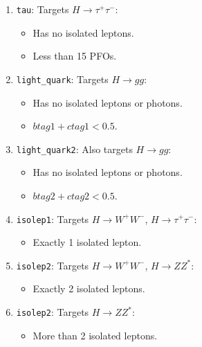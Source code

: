 \documentclass[11pt, hidelinks, a4paper]{scrartcl}
\newcommand{\tn}[1]{\textnormal{#1}}
\newcommand{\eV}{\text{e\kern-0.15ex V}\xspace}
\newcommand{\GeV}{\text{G\eV}\xspace}
\begin{document}
{\begin{multicols}{2}
\begin{enumerate}
      \begin{itemize}
          \item Has an isolated photon and no isolated leptons.
          \item Less than 15 PFOs.
          \item $E_H > 125~\GeV$.
          \item $\left| \tn{cos}\theta_{\gamma} \right| < 0.9$.
          \item $E_{\gamma} > 35~\GeV$.
      \end{itemize}
      \item \texttt{tau}: Targets $H \to \tau^+ \tau^-$:
      \begin{itemize}
          \item Has no isolated leptons.
          \item Less than 15 PFOs.
      \end{itemize}
      \item \texttt{light\_quark}: Targets $H \to gg$:
      \begin{itemize}
          \item Has no isolated leptons or photons.
          \item $btag1 + ctag1 < 0.5$.
      \end{itemize}
      \item \texttt{light\_quark2}: Also targets $H \to gg$:
      \begin{itemize}
          \item Has no isolated leptons or photons.
          \item $btag2 + ctag2 < 0.5$.
      \end{itemize}
      \item \texttt{isolep1}: Targets $H \to W^+ W^-$, $H \to \tau^+ \tau^-$:
      \begin{itemize}
          \item Exactly 1 isolated lepton.
      \end{itemize}
      \item \texttt{isolep2}: Targets $H \to W^+ W^-$, $H \to ZZ^*$:
      \begin{itemize}
          \item Exactly 2 isolated leptons.
      \end{itemize}
      \item \texttt{isolep2}: Targets $H \to ZZ^*$:
      \begin{itemize}
          \item More than 2 isolated leptons.
      \end{itemize}

\end{enumerate}
\end{multicols}}
\end{document}
